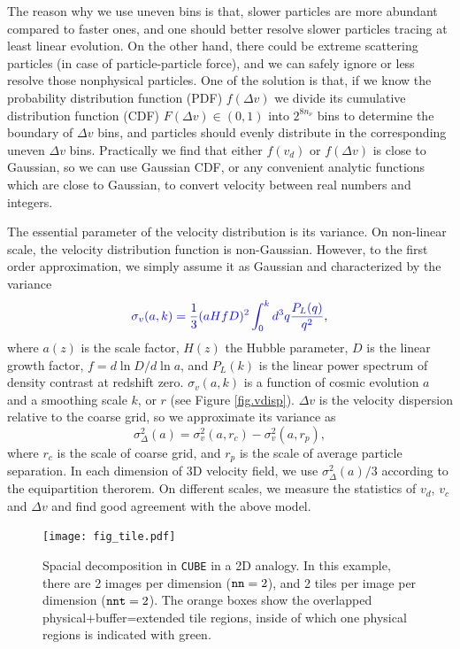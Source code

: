 \documentclass[10pt,twocolumn,preprint]{emulateapj}
\newcommand{\tcb}{\textcolor{blue}}
\begin{document}
The reason why we use uneven bins is that, slower particles are more 
abundant compared to faster ones, and one should better resolve slower 
particles tracing at least linear evolution. On the other hand, there could 
be extreme scattering particles (in case of particle-particle force), and we 
can safely ignore or less resolve those nonphysical particles. One of the 
solution is that, if we know the probability distribution function (PDF) 
$f(\Delta v)$ we divide its cumulative distribution function (CDF) $F(\Delta 
v)\in(0,1)$ into $2^{8n_\nu}$ bins to determine the boundary of $\Delta v$ 
bins, and particles should evenly distribute in the corresponding uneven $
\Delta v$ bins. Practically we find that either $f(v_d)$ or $f(\Delta v)$ is 
close to Gaussian, so we can use Gaussian CDF, or any convenient analytic 
functions which are close to Gaussian, to convert velocity between real 
numbers and integers.

The essential parameter of the velocity distribution is its variance. On 
non-linear scale, the velocity distribution function is non-Gaussian. 
However, to the first order approximation, we simply assume it as Gaussian 
and characterized by the variance
\begin{equation}\label{eq.vdisp}
	\tcb{ \sigma_v(a,k) = \frac{1}{3}  (a H f D)^2 \int_0^kd^3q\frac{P_{L}(q)}{q^2}},
\end{equation}
where $a(z)$ is the scale factor, $H(z)$ the Hubble parameter, $D$ is the 
linear growth factor, $f=d \ln D/d\ln a$, and $P_L(k)$ is the linear power 
spectrum of density contrast at redshift zero.
$\sigma_v(a,k)$ is a function of cosmic evolution $a$ and a smoothing scale 
$k$, or $r$ (see Figure \ref{fig.vdisp}). $\Delta v$
is the velocity dispersion relative to the coarse grid, so we approximate 
its variance as
\begin{equation}\label{eq.vdelta}
	\sigma^2_{\Delta}(a)=\sigma^2_v(a,r_c)-\sigma^2_v(a,r_p), 
\end{equation}
where $r_c$ is the scale of
coarse grid, and $r_p$ is the scale of average particle separation. In each
dimension of 3D velocity field, we use $\sigma^2_{\Delta}(a)/3$ according 
to the equipartition therorem. On different scales, we measure the 
statistics of $v_d$, $v_c$ and $\Delta v$ and find good agreement with the 
above model.

\begin{figure}
\centering
  \texttt{[image: fig\_tile.pdf]}
 \caption{Spacial decomposition in {\tt CUBE} in a 2D analogy. In this example, there are 2 images per dimension (${\tt nn}=2$), and 2 tiles per image per dimension (${\tt nnt}=2$). The orange boxes show the overlapped physical+buffer=extended tile regions, inside of which one physical regions is indicated with green.}
\label{fig.tile}
\end{figure}
\end{document}
